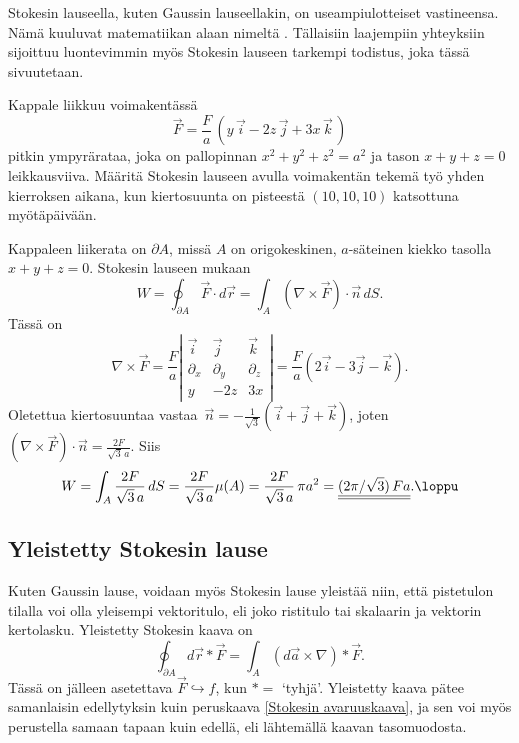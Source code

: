 Stokesin lauseella, kuten Gaussin lauseellakin, on useampiulotteiset vastineensa. Nämä kuuluvat
matematiikan alaan nimeltä . Tällaisiin laajempiin yhteyksiin
sijoittuu luontevimmin myös Stokesin lauseen tarkempi todistus, joka tässä sivuutetaan.
\begin{Exa}
Kappale liikkuu voimakentässä
\[
\vec F=\frac{F}{a}\,(y\,\vec i-2z\,\vec j+3x\,\vec k\,)
\]
pitkin ympyrärataa, joka on pallopinnan $x^2+y^2+z^2=a^2$ ja tason $x+y+z=0$ leikkausviiva. 
Määritä Stokesin lauseen avulla voimakentän tekemä työ yhden kierroksen aikana, kun
kiertosuunta on pisteestä $(10,10,10)$ katsottuna myötäpäivään.
\end{Exa}
\ratk Kappaleen liikerata on $\partial A$, missä $A$ on origokeskinen, $a$-säteinen kiekko
tasolla $x+y+z=0$. Stokesin lauseen mukaan
\[
W=\oint_{\partial A} \vec F\cdot d\vec r=\int_A (\nabla\times\vec F)\cdot\vec n\,dS.
\]
Tässä on
\[
\nabla\times\vec F
=\frac{F}{a} \left|\begin{array}{ccc} 
 \vec i & \vec j & \vec k \\ \partial_x & \partial_y & \partial_z \\ y & -2z & 3x
 \end{array}\right|
=\frac{F}{a}(2\vec i-3\vec j -\vec k).
\]
Oletettua kiertosuuntaa vastaa $\,\vec n=-\frac{1}{\sqrt{3}}(\vec i+\vec j+\vec k)$, joten
$(\nabla\times\vec F)\cdot\vec n = \frac{2F}{\sqrt{3}\,a}$. Siis
\[
W = \int_A \frac{2F}{\sqrt{3}\,a}\,dS = \frac{2F}{\sqrt{3}\,a}\mu(A)
  = \frac{2F}{\sqrt{3}\,a}\,\pi a^2 = \underline{\underline{(2\pi/\sqrt{3})\,Fa}}. \loppu
\]

\subsection*{Yleistetty Stokesin lause}

Kuten Gaussin lause, voidaan myös Stokesin lause yleistää niin, että pistetulon tilalla voi olla
yleisempi vektoritulo, eli joko ristitulo tai skalaarin ja vektorin kertolasku. Yleistetty
Stokesin kaava on
\[
\boxed{\quad \oint_{\partial A} d\vec r\ast\vec F=\int_A (d\vec a\times\nabla)\ast\vec F. \quad}
\]
Tässä on jälleen asetettava $\vec F\hookrightarrow f$, kun $\ast=$ `tyhjä'. Yleistetty kaava
pätee samanlaisin edellytyksin kuin peruskaava \eqref{Stokesin avaruuskaava}, ja sen voi myös 
perustella samaan tapaan kuin edellä, eli lähtemällä kaavan tasomuodosta.

